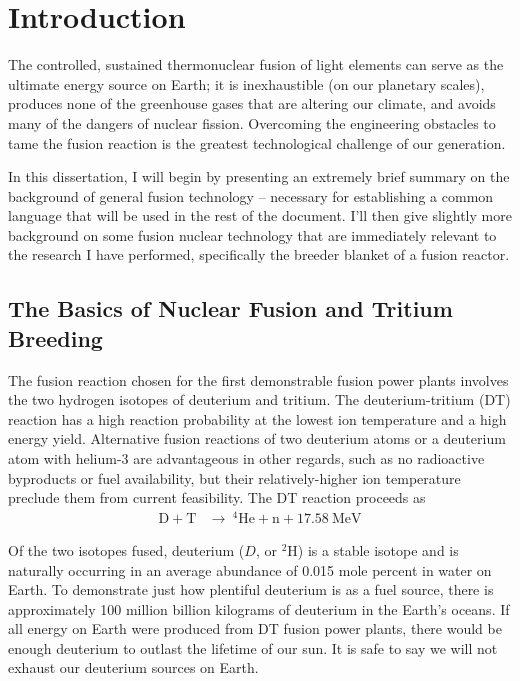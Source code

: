 \chapter{Introduction} \label{sec:introduction}
The controlled, sustained thermonuclear fusion of light elements can serve as the ultimate energy source on Earth; it is inexhaustible (on our planetary scales), produces none of the greenhouse gases that are altering our climate, and avoids many of the dangers of nuclear fission. Overcoming the engineering obstacles to tame the fusion reaction is the greatest technological challenge of our generation. %

In this dissertation, I will begin by presenting an extremely brief summary on the background of general fusion technology -- necessary for establishing a common language that will be used in the rest of the document. I'll then give slightly more background on some fusion nuclear technology that are immediately relevant to the research I have performed, specifically the breeder blanket of a fusion reactor.

\section{The Basics of Nuclear Fusion and Tritium Breeding}\label{sec:fusion-basics}

The fusion reaction chosen for the first demonstrable fusion power plants involves the two hydrogen isotopes of deuterium and tritium. The deuterium-tritium (DT) reaction has a high reaction probability at the lowest ion temperature and a high energy yield. Alternative fusion reactions of two deuterium atoms or a deuterium atom with helium-3 are advantageous in other regards, such as no radioactive byproducts or fuel availability, but their relatively-higher ion temperature preclude them from current feasibility.\cite{abdou} The DT reaction proceeds as
\begin{align}
	\mathrm{D} + \mathrm{T}&\xrightarrow{}\ ^4\mathrm{He}+\mathrm{n}+17.58\ \text{MeV} \label{eq:dt-reaction}
\end{align}

Of the two isotopes fused, deuterium ($D$, or $^2$H) is a stable isotope and is naturally occurring in an average abundance of 0.015 mole percent in water on Earth. To demonstrate just how plentiful deuterium is as a fuel source, there is approximately 100 million billion kilograms of deuterium in the Earth's oceans. If all energy on Earth were produced from DT fusion power plants, there would be enough deuterium to outlast the lifetime of our sun. It is safe to say we will not exhaust our deuterium sources on Earth.

